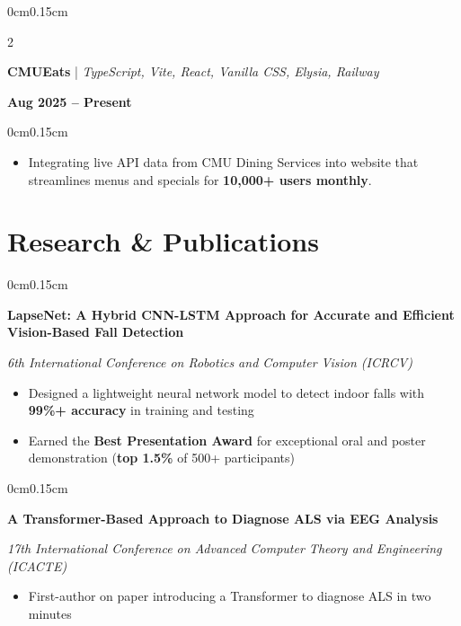 \documentclass[10pt, letterpaper]{article}
\newenvironment{highlights}{
    \begin{itemize}[topsep=0pt, parsep=0pt, partopsep=0pt, itemsep=0pt, leftmargin=0.6cm]
}{
    \end{itemize}
}
\newenvironment{onecolentry}{
    \begin{adjustwidth}{0cm}{0.15cm}
}{
    \end{adjustwidth}
}
\newenvironment{twocolentry}[2][]{
    \onecolentry
    \def\secondColumn{#2}
    \setcolumnwidth{\fill, 4cm}
    \begin{paracol}{2}
}{
    \switchcolumn \raggedleft \secondColumn
    \end{paracol}
    \endonecolentry
}
\begin{document}
    \vspace{0.05cm}

    \begin{twocolentry}{\textbf{Aug 2025 -- Present}}
        \textbf{CMUEats} | \textit{TypeScript, Vite, React, Vanilla CSS, Elysia, Railway}
    \end{twocolentry}
    \vspace{-0.1cm}
    \begin{onecolentry}
        \begin{highlights}
            \item Integrating live API data from CMU Dining Services into website that streamlines menus and specials for \textbf{10,000+ users monthly}.
        \end{highlights}
    \end{onecolentry}

    \vspace{0.05cm}
    \section{Research \& Publications}
    \vspace{0.1cm}

    \begin{onecolentry}
        \textbf{LapseNet: A Hybrid CNN-LSTM Approach for Accurate and Efficient Vision-Based Fall Detection}
        
        \textit{6th International Conference on Robotics and Computer Vision (ICRCV)}
        \begin{highlights}
            \item Designed a lightweight neural network model to detect indoor falls with \textbf{99\%+ accuracy} in training and testing
            \item Earned the \textbf{Best Presentation Award} for exceptional oral and poster demonstration (\textbf{top 1.5\%} of 500+ participants)
        \end{highlights}
    \end{onecolentry}

    \vspace{0.05cm}

    \begin{onecolentry}
        \textbf{A Transformer-Based Approach to Diagnose ALS via EEG Analysis}
        
        \textit{17th International Conference on Advanced Computer Theory and Engineering (ICACTE)}
        \begin{highlights}
            \item First-author on paper introducing a Transformer to diagnose ALS in two minutes
        \end{highlights}
    \end{onecolentry}
\end{document}
